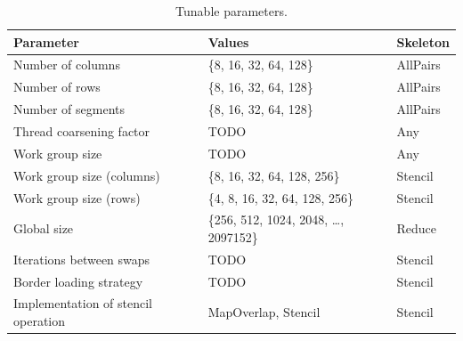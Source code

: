 
\begin{table}
\footnotesize
\centering
\begin{tabular}{| l | l | l |}
\hline
\textbf{Parameter} & \textbf{Values} & \textbf{Skeleton}\\
\hline
Number of columns & \{8, 16, 32, 64, 128\} & AllPairs\\
Number of rows & \{8, 16, 32, 64, 128\} & AllPairs\\
Number of segments & \{8, 16, 32, 64, 128\} & AllPairs\\
Thread coarsening factor & TODO & Any\\
Work group size & TODO & Any\\
Work group size (columns) & \{8, 16, 32, 64, 128, 256\} & Stencil\\
Work group size (rows) & \{4, 8, 16, 32, 64, 128, 256\} & Stencil\\
Global size & \{256, 512, 1024, 2048, \ldots, 2097152\} & Reduce\\
Iterations between swaps & TODO & Stencil\\
Border loading strategy & TODO & Stencil\\
Implementation of stencil operation & {MapOverlap, Stencil} & Stencil\\
\hline
\end{tabular}
\caption{Tunable parameters.}
\label{tab:knobs}
\end{table}

